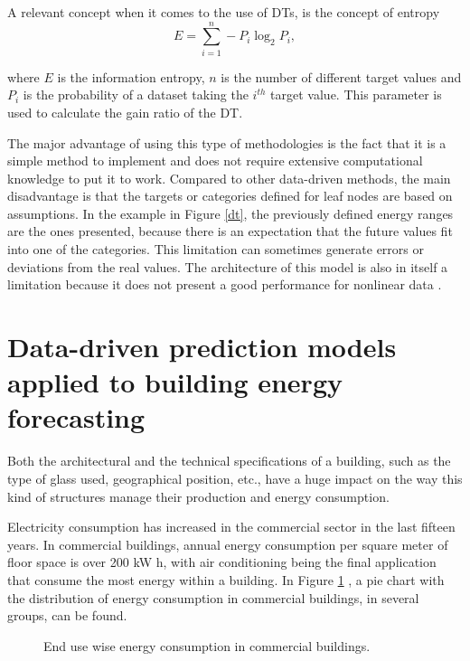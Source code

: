 A relevant concept when it comes to the use of \ac{DT}s, is the concept of entropy
\begin{equation}
       E=\sum_{i=1}^n -P_i\log_2P_i,
\label{entropy}
\end{equation}

where $E$ is the information entropy, $n$ is the number of different target values and $P_i$ is the probability of a dataset taking the $i^{th}$ target value. This parameter is used to calculate the gain ratio of the \ac{DT}.

The major advantage of using this type of methodologies is the fact that it is a simple method to implement and does not require extensive computational knowledge to put it to work. Compared to other data-driven methods, the main disadvantage is that the targets or categories defined for leaf nodes are based on assumptions. In the example in Figure \ref{dt}, the previously defined energy ranges are the ones presented, because there is an expectation that the future values fit into one of the categories. This limitation can sometimes generate errors or deviations from the real values. The architecture of this model is also in itself a limitation because it does not present a good performance for nonlinear data \cite{dt2}.


\section{Data-driven prediction models applied to building energy forecasting \label{c}}

Both the architectural and the technical specifications of a building, such as the type of glass used, geographical position, etc., have a huge impact on the way this kind of structures manage their production and energy consumption. 

Electricity consumption has increased in the commercial sector in the last fifteen years.  In commercial buildings, annual energy consumption per square meter of floor space is over 200 kW h, with air conditioning being the final application that consume the most energy within a building\cite{pie_1}. In Figure \ref{buildingenergy} \cite{pie_1}, a pie chart with the distribution of energy consumption in commercial buildings, in several groups, can be found.


\begin{figure}[h!]
    \centering
    \begin{center}
    \caption{End use wise energy consumption in commercial buildings.}
    \label{buildingenergy}
    \end{center}
\end{figure}


